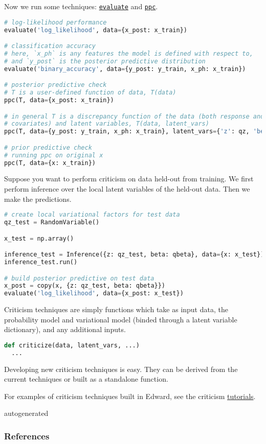 Now we run some techniques:
\href{/tutorials/point-evaluation}{\texttt{evaluate}}
and
\href{/tutorials/ppc}{\texttt{ppc}}.

\begin{lstlisting}[language=Python]
# log-likelihood performance
evaluate('log_likelihood', data={x_post: x_train})

# classification accuracy
# here, `x_ph` is any features the model is defined with respect to,
# and `y_post` is the posterior predictive distribution
evaluate('binary_accuracy', data={y_post: y_train, x_ph: x_train})

# posterior predictive check
# T is a user-defined function of data, T(data)
ppc(T, data={x_post: x_train})

# in general T is a discrepancy function of the data (both response and
# covariates) and latent variables, T(data, latent_vars)
ppc(T, data={y_post: y_train, x_ph: x_train}, latent_vars={'z': qz, 'beta': qbeta})

# prior predictive check
# running ppc on original x
ppc(T, data={x: x_train})
\end{lstlisting}

Suppose you want to perform criticism on data held-out from training.
We first perform inference over the local latent variables of the
held-out data. Then we make the predictions.

\begin{lstlisting}[language=Python]
# create local variational factors for test data
qz_test = RandomVariable()

x_test = np.array()

inference_test = Inference({z: qz_test, beta: qbeta}, data={x: x_test})
inference_test.run()

# build posterior predictive on test data
x_post = copy(x, {z: qz_test, beta: qbeta}})
evaluate('log_likelihood', data={x_post: x_test})
\end{lstlisting}

Criticism techniques are simply functions which take as input data,
the probability model and variational model (binded through a latent
variable dictionary), and any additional inputs.

\begin{lstlisting}[language=Python]
def criticize(data, latent_vars, ...)
  ...
\end{lstlisting}

Developing new criticism techniques is easy.  They can be derived from
the current techniques or built as a standalone function.

For examples of criticism techniques built in Edward, see the
criticism
\href{/tutorials/}{tutorials}.

{{autogenerated}}

\subsubsection{References}\label{references}
